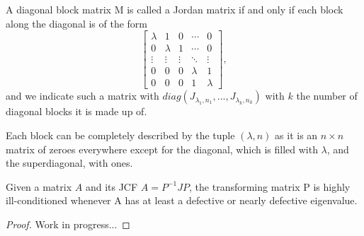 \begin{definition}
    A diagonal block matrix M is called a Jordan matrix if and only if each block along the diagonal is of the form
    \[
        \begin{bmatrix}
            \lambda     &    1         &    0     &   \cdots   &    0    \\
                0       &    \lambda   &    1     &   \cdots   &    0    \\
            \vdots      &    \vdots    &  \vdots  &   \ddots   & \vdots  \\
                0       &       0      &     0    &  \lambda   &    1    \\
                0       &       0      &     0    &     1      & \lambda
        \end{bmatrix},
    \]
    and we indicate such a matrix with
    \(diag(J_{\lambda_{1}, n_{1}}, ..., J_{\lambda_{k}, n_{k}})\) with \(k\) the number of diagonal blocks it is made up of.

    Each block can be completely described by the tuple \((\lambda, n)\) as it is an \(n \times n\) matrix of zeroes everywhere
    except for the diagonal, which is filled with \(\lambda\), and the superdiagonal, with ones.
\end{definition}

\begin{theorem}
    
\end{theorem}

\begin{theorem}
    Given a matrix \(A\) and its JCF \(A = P^{-1}JP\), the transforming matrix P is highly ill-conditioned
    whenever A has at least a defective or nearly defective eigenvalue.
\end{theorem}
\begin{proof}
    Work in progress...
\end{proof}